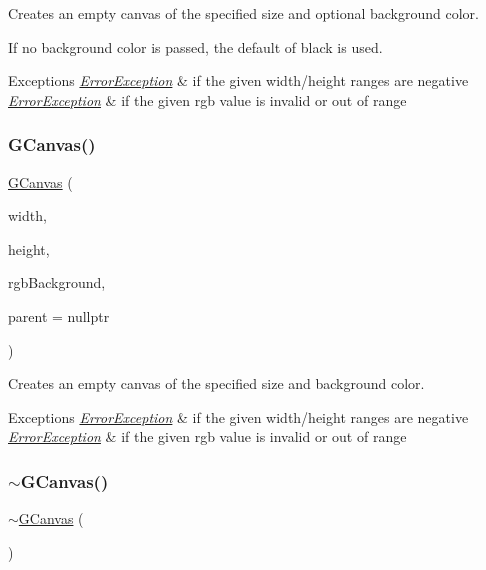 Creates an empty canvas of the specified size and optional background color. 

If no background color is passed, the default of black is used. 
\begin{DoxyExceptions}{Exceptions}
{\em \mbox{\hyperlink{classErrorException}{Error\+Exception}}} & if the given width/height ranges are negative \\
\hline
{\em \mbox{\hyperlink{classErrorException}{Error\+Exception}}} & if the given rgb value is invalid or out of range \\
\hline
\end{DoxyExceptions}
\mbox{\label{classGCanvas_acc055a20116c6767125897b0a851e5cb}} 
\subsubsection{\texorpdfstring{G\+Canvas()}{GCanvas()}\hspace{0.1cm}{\footnotesize\ttfamily [4/4]}}
{\footnotesize\ttfamily \mbox{\hyperlink{classGCanvas}{G\+Canvas}} (\begin{DoxyParamCaption}\item[{double}]{width,  }\item[{double}]{height,  }\item[{const std\+::string \&}]{rgb\+Background,  }\item[{Q\+Widget $\ast$}]{parent = {\ttfamily nullptr} }\end{DoxyParamCaption})}



Creates an empty canvas of the specified size and background color. 


\begin{DoxyExceptions}{Exceptions}
{\em \mbox{\hyperlink{classErrorException}{Error\+Exception}}} & if the given width/height ranges are negative \\
\hline
{\em \mbox{\hyperlink{classErrorException}{Error\+Exception}}} & if the given rgb value is invalid or out of range \\
\hline
\end{DoxyExceptions}
\mbox{\label{classGCanvas_a6b9dcf515cbbdf3432aea0946f5cc15f}} 
\subsubsection{\texorpdfstring{$\sim$\+G\+Canvas()}{~GCanvas()}}
{\footnotesize\ttfamily $\sim$\mbox{\hyperlink{classGCanvas}{G\+Canvas}} (\begin{DoxyParamCaption}{ }\end{DoxyParamCaption})\hspace{0.3cm}{\ttfamily [virtual]}}



